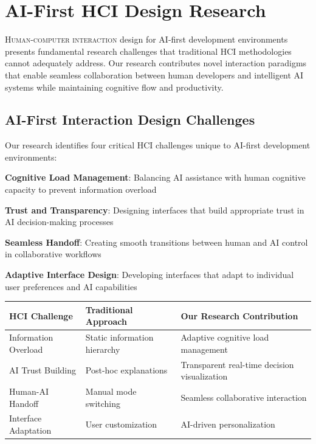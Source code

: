 
\section*{AI-First HCI Design Research}

\lettrine{H}{uman-computer interaction} design for AI-first development environments presents fundamental research challenges that traditional HCI methodologies cannot adequately address. Our research contributes novel interaction paradigms that enable seamless collaboration between human developers and intelligent AI systems while maintaining cognitive flow and productivity.

\subsection*{AI-First Interaction Design Challenges}

Our research identifies four critical HCI challenges unique to AI-first development environments:

\begin{expandedlist}
    \item \textbf{Cognitive Load Management}: Balancing AI assistance with human cognitive capacity to prevent information overload
    \item \textbf{Trust and Transparency}: Designing interfaces that build appropriate trust in AI decision-making processes
    \item \textbf{Seamless Handoff}: Creating smooth transitions between human and AI control in collaborative workflows
    \item \textbf{Adaptive Interface Design}: Developing interfaces that adapt to individual user preferences and AI capabilities
\end{expandedlist}

\begin{center}
\begin{tabular}{@{}lll@{}}
\toprule
\textbf{HCI Challenge} & \textbf{Traditional Approach} & \textbf{Our Research Contribution} \\
\midrule
Information Overload & Static information hierarchy & Adaptive cognitive load management \\
AI Trust Building & Post-hoc explanations & Transparent real-time decision visualization \\
Human-AI Handoff & Manual mode switching & Seamless collaborative interaction \\
Interface Adaptation & User customization & AI-driven personalization \\
\bottomrule
\end{tabular}
\end{center}

